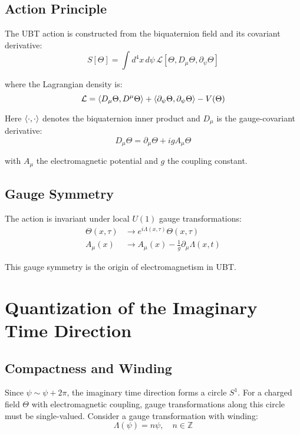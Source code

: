 \documentclass[12pt, a4paper]{article}
\theoremstyle{definition}
\theoremstyle{remark}
\begin{document}
\subsection{Action Principle}

The UBT action is constructed from the biquaternion field and its covariant derivative:
\begin{equation}
S[\Theta] = \int d^4x \, d\psi \, \mathcal{L}[\Theta, D_\mu\Theta, \partial_\psi\Theta]
\end{equation}

where the Lagrangian density is:
\begin{equation}
\mathcal{L} = \braket{D_\mu \Theta, D^\mu \Theta} + \braket{\partial_\psi \Theta, \partial_\psi \Theta} - V(\Theta)
\end{equation}

Here $\braket{\cdot, \cdot}$ denotes the biquaternion inner product and $D_\mu$ is the gauge-covariant derivative:
\begin{equation}
D_\mu \Theta = \partial_\mu \Theta + i g A_\mu \Theta
\end{equation}

with $A_\mu$ the electromagnetic potential and $g$ the coupling constant.

\subsection{Gauge Symmetry}

The action is invariant under local $U(1)$ gauge transformations:
\begin{align}
\Theta(x,\tau) &\to e^{i\Lambda(x,\tau)} \Theta(x,\tau) \\
A_\mu(x) &\to A_\mu(x) - \frac{1}{g}\partial_\mu \Lambda(x,t)
\end{align}

This gauge symmetry is the origin of electromagnetism in UBT.

\section{Quantization of the Imaginary Time Direction}

\subsection{Compactness and Winding}

Since $\psi \sim \psi + 2\pi$, the imaginary time direction forms a circle $S^1$. For a charged field $\Theta$ with electromagnetic coupling, gauge transformations along this circle must be single-valued. Consider a gauge transformation with winding:
\begin{equation}
\Lambda(\psi) = n \psi, \quad n \in \mathbb{Z}
\end{equation}
\end{document}
